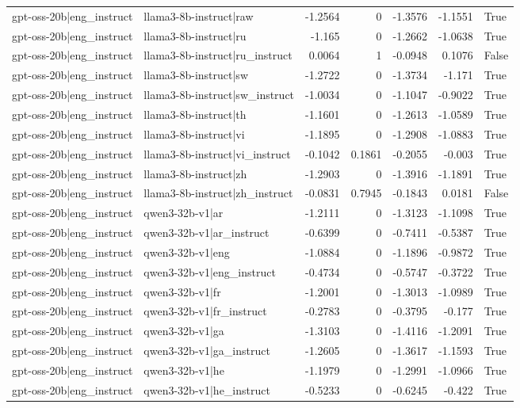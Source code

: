 \begin{table}
\begin{tabular}{l l r r r r l}
gpt-oss-20b|eng_instruct & llama3-8b-instruct|raw & -1.2564 & 0 & -1.3576 & -1.1551 & True \\
gpt-oss-20b|eng_instruct & llama3-8b-instruct|ru & -1.165 & 0 & -1.2662 & -1.0638 & True \\
gpt-oss-20b|eng_instruct & llama3-8b-instruct|ru_instruct & 0.0064 & 1 & -0.0948 & 0.1076 & False \\
gpt-oss-20b|eng_instruct & llama3-8b-instruct|sw & -1.2722 & 0 & -1.3734 & -1.171 & True \\
gpt-oss-20b|eng_instruct & llama3-8b-instruct|sw_instruct & -1.0034 & 0 & -1.1047 & -0.9022 & True \\
gpt-oss-20b|eng_instruct & llama3-8b-instruct|th & -1.1601 & 0 & -1.2613 & -1.0589 & True \\
gpt-oss-20b|eng_instruct & llama3-8b-instruct|vi & -1.1895 & 0 & -1.2908 & -1.0883 & True \\
gpt-oss-20b|eng_instruct & llama3-8b-instruct|vi_instruct & -0.1042 & 0.1861 & -0.2055 & -0.003 & True \\
gpt-oss-20b|eng_instruct & llama3-8b-instruct|zh & -1.2903 & 0 & -1.3916 & -1.1891 & True \\
gpt-oss-20b|eng_instruct & llama3-8b-instruct|zh_instruct & -0.0831 & 0.7945 & -0.1843 & 0.0181 & False \\
gpt-oss-20b|eng_instruct & qwen3-32b-v1|ar & -1.2111 & 0 & -1.3123 & -1.1098 & True \\
gpt-oss-20b|eng_instruct & qwen3-32b-v1|ar_instruct & -0.6399 & 0 & -0.7411 & -0.5387 & True \\
gpt-oss-20b|eng_instruct & qwen3-32b-v1|eng & -1.0884 & 0 & -1.1896 & -0.9872 & True \\
gpt-oss-20b|eng_instruct & qwen3-32b-v1|eng_instruct & -0.4734 & 0 & -0.5747 & -0.3722 & True \\
gpt-oss-20b|eng_instruct & qwen3-32b-v1|fr & -1.2001 & 0 & -1.3013 & -1.0989 & True \\
gpt-oss-20b|eng_instruct & qwen3-32b-v1|fr_instruct & -0.2783 & 0 & -0.3795 & -0.177 & True \\
gpt-oss-20b|eng_instruct & qwen3-32b-v1|ga & -1.3103 & 0 & -1.4116 & -1.2091 & True \\
gpt-oss-20b|eng_instruct & qwen3-32b-v1|ga_instruct & -1.2605 & 0 & -1.3617 & -1.1593 & True \\
gpt-oss-20b|eng_instruct & qwen3-32b-v1|he & -1.1979 & 0 & -1.2991 & -1.0966 & True \\
gpt-oss-20b|eng_instruct & qwen3-32b-v1|he_instruct & -0.5233 & 0 & -0.6245 & -0.422 & True \\

\end{tabular}
\end{table}
